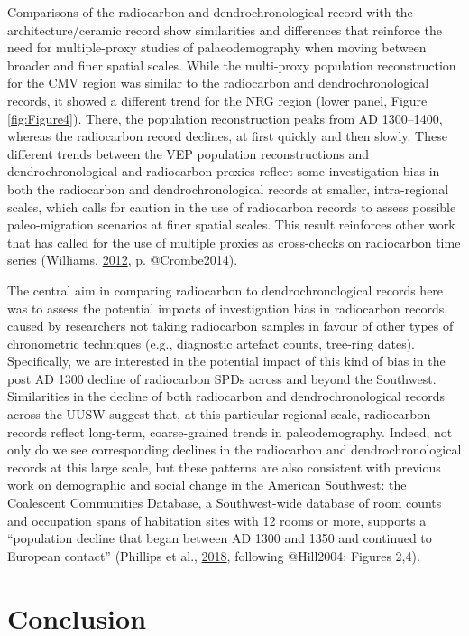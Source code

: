 \documentclass[
]{sa}
\begin{document}
Comparisons of the radiocarbon and dendrochronological record with the architecture/ceramic record show similarities and differences that reinforce the need for multiple-proxy studies of palaeodemography when moving between broader and finer spatial scales. While the multi-proxy population reconstruction for the CMV region was similar to the radiocarbon and dendrochronological records, it showed a different trend for the NRG region (lower panel, Figure \ref{fig:Figure4}). There, the population reconstruction peaks from AD 1300--1400, whereas the radiocarbon record declines, at first quickly and then slowly. These different trends between the VEP population reconstructions and dendrochronological and radiocarbon proxies reflect some investigation bias in both the radiocarbon and dendrochronological records at smaller, intra-regional scales, which calls for caution in the use of radiocarbon records to assess possible paleo-migration scenarios at finer spatial scales. This result reinforces other work that has called for the use of multiple proxies as cross-checks on radiocarbon time series (Williams, \protect\hyperlink{ref-Williams2012}{2012}, p. @Crombe2014).

The central aim in comparing radiocarbon to dendrochronological records here was to assess the potential impacts of investigation bias in radiocarbon records, caused by researchers not taking radiocarbon samples in favour of other types of chronometric techniques (e.g., diagnostic artefact counts, tree-ring dates). Specifically, we are interested in the potential impact of this kind of bias in the post AD 1300 decline of radiocarbon SPDs across and beyond the Southwest. Similarities in the decline of both radiocarbon and dendrochronological records across the UUSW suggest that, at this particular regional scale, radiocarbon records reflect long-term, coarse-grained trends in paleodemography. Indeed, not only do we see corresponding declines in the radiocarbon and dendrochronological records at this large scale, but these patterns are also consistent with previous work on demographic and social change in the American Southwest: the Coalescent Communities Database, a Southwest-wide database of room counts and occupation spans of habitation sites with 12 rooms or more, supports a ``population decline that began between AD 1300 and 1350 and continued to European contact'' (Phillips et al., \protect\hyperlink{ref-Phillips2018}{2018}, following @Hill2004: Figures 2,4).

\hypertarget{conclusion}{%
\section*{Conclusion}\label{conclusion}}
\end{document}
